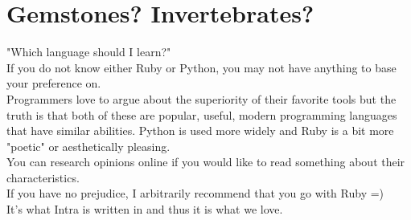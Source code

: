 \documentclass{42-en}
\begin{document}


\section{Gemstones? Invertebrates?}

"Which language should I learn?"\\

If you do not know either Ruby or Python, you may not have anything to base your preference on.\\

Programmers love to argue about the superiority of their favorite tools but the truth is that both of these are popular, useful, modern programming languages that have similar abilities. Python is used more widely and Ruby is a bit more "poetic" or aesthetically pleasing.\\

You can research opinions online if you would like to read something about their characteristics.\\

If you have no prejudice, I arbitrarily recommend that you go with Ruby =)\\

It's what Intra is written in and thus it is what we love.\\

\end{document}
